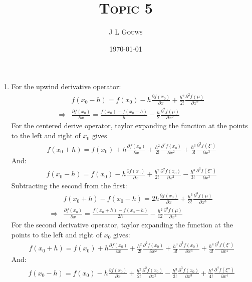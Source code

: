 \documentclass[12pt,a4]{article}
\title{
\textsc{Topic 5}
}
\author{\textsc{J L Gouws}
}
\date{\today
\\[1cm]}
\begin{document}
\thispagestyle{empty}

\maketitle

\begin{enumerate}
  \item
    For the upwind derivative operator:
    \begin{align*}
                  & f(x_0 - h) = f(x_0) - h \frac{\partial f(x_0)}{\partial x} + \frac{h^2}{2!} \frac{\partial^2 f(\mu)}{\partial x^2}\\
      \Rightarrow & \frac{\partial f(x_0)}{\partial x} = \frac{f(x_0) - f(x_0 - h)}{h} - \frac{h}{2} \frac{\partial^2 f(\mu)}{\partial x^2}
    \end{align*}
    For the centered derive operator, taylor expanding the function at the points to the left and right of $x_0$ gives
    \begin{align*}
      f(x_0 + h) = f(x_0) + h \frac{\partial f(x_0)}{\partial x} + \frac{h^2}{2!} \frac{\partial^2 f(x_0)}{\partial x^2} + \frac{h^3}{3!} \frac{\partial^3 f(\xi')}{\partial x^3} 
    \end{align*}
    And:
    \begin{align*}
      f(x_0 - h) = f(x_0) - h \frac{\partial f(x_0)}{\partial x} + \frac{h^2}{2!} \frac{\partial^2 f(x_0)}{\partial x^2} - \frac{h^3}{3!} \frac{\partial^3 f(\xi'')}{\partial x^3}
    \end{align*}
    Subtracting the second from the first:
    \begin{align*}
      & f(x_0 + h) - f(x_0 - h) = 2 h \frac{\partial f(x_0)}{\partial x} + \frac{h^3}{3!} \frac{\partial^3 f(\mu)}{\partial x^3} \\
      \Rightarrow & \frac{\partial f(x_0)}{\partial x} = \frac{f(x_0 + h) - f(x_0 - h)}{ 2 h}  - \frac{h^2}{12} \frac{\partial^3 f(\mu)}{\partial x^3} 
    \end{align*}
    For the second derivative operator, taylor expanding the function at the points to the left and right of $x_0$ gives:
    \begin{align*}
      f(x_0 + h) = f(x_0) + h \frac{\partial f(x_0)}{\partial x} + \frac{h^2}{2!} \frac{\partial^2 f(x_0)}{\partial x^2} + \frac{h^3}{3!} \frac{\partial^3 f(x_0)}{\partial x^3} + \frac{h^4}{4!} \frac{\partial^4 f(\xi')}{\partial x^4}
    \end{align*}
    And:
    \begin{align*}
      f(x_0 - h) = f(x_0) - h \frac{\partial f(x_0)}{\partial x} + \frac{h^2}{2!} \frac{\partial^2 f(x_0)}{\partial x^2} - \frac{h^3}{3!} \frac{\partial^3 f(x_0)}{\partial x^3} + \frac{h^4}{4!} \frac{\partial^4 f(\xi '')}{\partial x^4}

\end{align*}
\end{enumerate}
\end{document}
